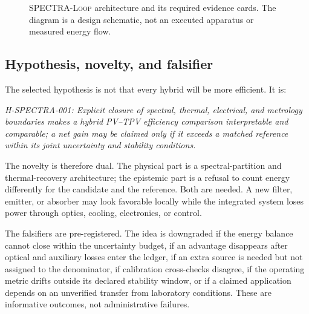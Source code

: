 \documentclass[conference]{../../../../Conference-LaTeX-template_10-17-19/IEEEtran}
\newcommand{\spectraloop}{\textsc{SPECTRA-Loop}}
\begin{document}
\begin{figure}[!t]
\centering
{}
\caption{\spectraloop{} architecture and its required evidence cards. The diagram is a design schematic, not an executed apparatus or measured energy flow.}
\label{fig:loop}
\end{figure}

\subsection{Hypothesis, novelty, and falsifier}
The selected hypothesis is not that every hybrid will be more efficient. It is:

\emph{H-SPECTRA-001: Explicit closure of spectral, thermal, electrical, and metrology boundaries makes a hybrid PV--TPV efficiency comparison interpretable and comparable; a net gain may be claimed only if it exceeds a matched reference within its joint uncertainty and stability conditions.}

The novelty is therefore dual. The physical part is a spectral-partition and thermal-recovery architecture; the epistemic part is a refusal to count energy differently for the candidate and the reference. Both are needed. A new filter, emitter, or absorber may look favorable locally while the integrated system loses power through optics, cooling, electronics, or control.

The falsifiers are pre-registered. The idea is downgraded if the energy balance cannot close within the uncertainty budget, if an advantage disappears after optical and auxiliary losses enter the ledger, if an extra source is needed but not assigned to the denominator, if calibration cross-checks disagree, if the operating metric drifts outside its declared stability window, or if a claimed application depends on an unverified transfer from laboratory conditions. These are informative outcomes, not administrative failures.
\end{document}
